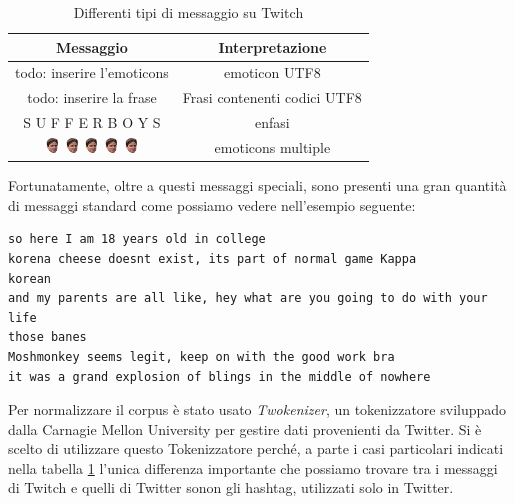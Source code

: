 \documentclass[a4paper,12pt,openright,twoside]{report}
\theoremstyle{definition}
\begin{document}
\begin{table}[h]
	\centering
	\begin{tabular}{|c|c|}
		\hline
		Messaggio & Interpretazione \\
		\hline
		\hline
		todo: inserire l'emoticons & emoticon UTF8 \\
		\hline
		todo: inserire la frase  & Frasi contenenti codici UTF8 \\
		\hline
		S U F F E R B O Y S & enfasi \\
		\hline
		\includegraphics[height=0.4cm, width=0.4cm]{Immagini/Emoticons/kappahd.png} \includegraphics[height=0.4cm, width=0.4cm]{Immagini/Emoticons/kappahd.png} \includegraphics[height=0.4cm, width=0.4cm]{Immagini/Emoticons/kappahd.png} \includegraphics[height=0.4cm, width=0.4cm]{Immagini/Emoticons/kappahd.png} \includegraphics[height=0.4cm, width=0.4cm]{Immagini/Emoticons/kappahd.png} & emoticons multiple \\
		\hline
	\end{tabular}
	\caption{Differenti tipi di messaggio su Twitch}
	\label{tab:messaggiTwitch}
\end{table}

Fortunatamente, oltre a questi messaggi speciali, 
sono presenti una gran quantità di messaggi standard come possiamo vedere nell'esempio seguente:

\begin{verbatim}
so here I am 18 years old in college
korena cheese doesnt exist, its part of normal game Kappa
korean
and my parents are all like, hey what are you going to do with your life
those banes
Moshmonkey seems legit, keep on with the good work bra
it was a grand explosion of blings in the middle of nowhere
\end{verbatim}

Per normalizzare il corpus è stato usato \emph{Twokenizer}, un tokenizzatore sviluppado dalla Carnagie Mellon University
per gestire dati provenienti da Twitter. 
Si è scelto di utilizzare questo Tokenizzatore perché, a parte i casi particolari indicati 
nella tabella
\ref{tab:messaggiTwitch} l'unica differenza importante che possiamo trovare tra i messaggi di Twitch e
quelli di Twitter sonon gli
hashtag, utilizzati solo in Twitter. 
\end{document}
